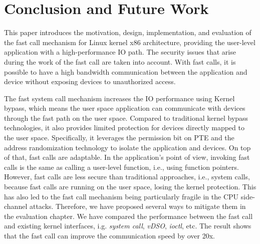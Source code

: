 \chapter{Conclusion and Future Work}
\label{sec:conclusion}




This paper introduces the motivation, design, implementation, 
and evaluation of the fast call mechanism for Linux kernel x86 
architecture, providing the user-level application with a 
high-performance IO path. The security issues that arise 
during the work of the fast call are taken into account. 
With fast calls, it is possible to have a high bandwidth 
communication between the application and device without 
exposing devices to unauthorized access.

The fast system call mechanism increases the IO performance using 
Kernel bypass, which means the user space application can communicate 
with devices through the fast path on the user space. Compared to 
traditional kernel bypass technologies, it also provides limited 
protection for devices directly mapped to the user space. 
Specifically, it leverages the permission bit on PTE and 
the address randomization technology to isolate the 
application and devices. On top of that,  fast calls 
are adaptable. In the application's point of view, 
invoking fast calls is the same as calling a user-level 
function, i.e., using function pointers.  However,  
fast calls are less secure than traditional approaches, i.e., 
system calls, because fast calls are running on the user space, 
losing the kernel protection.  This has also led to the fast 
call mechanism being particularly fragile in the CPU side-channel 
attacks. Therefore, we have proposed several ways to mitigate them 
in the evaluation chapter. 
We have compared the performance between the fast call and 
existing kernel interfaces, i.g. \emph{system call}, \emph{vDSO}\cite{9}, \emph{ioctl}, etc. 
The result shows that the fast call can improve the communication 
speed by over 20x.


